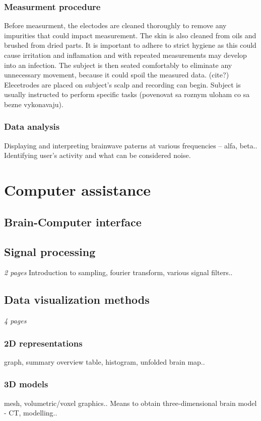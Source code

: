 \subsection{Measurment procedure}
Before measurment, the electodes are cleaned thoroughly to remove any impurities
that could impact measurement. The skin is also cleaned from oils and brushed
from dried parts. It is important to adhere to strict hygiene as
this could cause irritation and inflamation and with repeated measurements may
develop into an infection.\cite{eegFund} The subject is then seated comfortably
to eliminate any unnecessary movement, because it could spoil the measured data.
(cite?) Elecetrodes are placed on subject's scalp and recording can begin.
Subject is usually instructed to perform specific tasks (povenovat sa roznym
uloham co sa bezne vykonavaju).

\subsection{Data analysis}
Displaying and interpreting brainwave paterns at various frequencies -- alfa,
beta.. Identifying user's activity and what can be considered noise.
\chapter{Computer assistance}
\section{Brain-Computer interface} 
\section{Signal processing}
\emph{2 pages}
Introduction to sampling, fourier transform, various signal filters..
\section{Data visualization methods}
\emph{4 pages}
\subsection{2D representations}
graph, summary overview table, histogram, unfolded brain map..
\subsection{3D models}
mesh, volumetric/voxel graphics.. 
Means to obtain three-dimensional brain model - CT, modelling..
